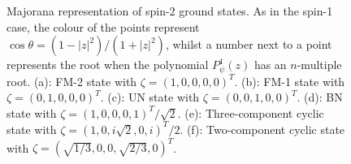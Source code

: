 \begin{figure}
    \caption[Majorana representation of spin-2 ground states]
    {\label{fig: spin-2-Majorana}Majorana representation of spin-2 ground
    states.
    As in the spin-1 case, the colour of the points represent \(\cos\theta =
    (1-|z|^2)/(1+|z|^2)\), whilst a number next to a point represents the root
    when the polynomial \(P_\psi^1(z)\) has an \(n\)-multiple root.
    (a): FM-2 state with \(\zeta={(1, 0, 0, 0, 0)}^T\).
    (b): FM-1 state with \(\zeta={(0, 1, 0, 0, 0)}^T\).
    (c): UN state with \(\zeta={(0, 0, 1, 0, 0)}^T\).
    (d): BN state with \(\zeta={(1, 0, 0, 0, 1)}^T/\sqrt{2}\).
    (e): Three-component cyclic state with
    \(\zeta={(1, 0, i\sqrt{2}, 0, i)}^T/2\).
    (f): Two-component cyclic state with
    \(\zeta={(\sqrt{1/3}, 0, 0, \sqrt{2/3}, 0)}^T\).}
\end{figure}

